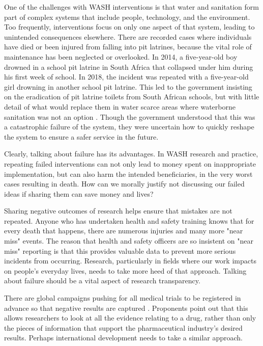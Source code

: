 \documentclass[twocolumn, serif, authordate, editorial]{jote-article}
\begin{document}
One of the challenges with WASH interventions is that water and sanitation form part of complex systems that include people, technology, and the environment. Too frequently, interventions focus on only one aspect of that system, leading to unintended consequences elsewhere. There are recorded cases where individuals have died or been injured from falling into pit latrines, because the vital role of maintenance has been neglected or overlooked. In 2014, a five-year-old boy drowned in a school pit latrine in South Africa that collapsed under him during his first week of school. In 2018, the incident was repeated with a five-year-old girl drowning in another school pit latrine. This led to the government insisting on the eradication of pit latrine toilets from South African schools, but with little detail of what would replace them in water scarce areas where waterborne sanitation was not an option \parencite{Fihlani2018}. Though the government understood that this was a catastrophic failure of the system, they were uncertain how to quickly reshape the system to ensure a safer service in the future.

Clearly, talking about failure has its advantages. In WASH research and practice, repeating failed interventions can not only lead to money spent on inappropriate implementation, but can also harm the intended beneficiaries, in the very worst cases resulting in death. How can we morally justify not discussing our failed ideas if sharing them can save money and lives?

Sharing negative outcomes of research helps ensure that mistakes are not repeated. Anyone who has undertaken health and safety training knows that for every death that happens, there are numerous injuries and many more "near miss" events. The reason that health and safety officers are so insistent on "near miss" reporting is that this provides valuable data to prevent more serious incidents from occurring. Research, particularly in fields where our work impacts on people’s everyday lives, needs to take more heed of that approach. Talking about failure should be a vital aspect of research transparency.

There are global campaigns pushing for all medical trials to be registered in advance so that negative results are captured \parencite{Goldacre2016}. Proponents point out that this allows researchers to look at all the evidence relating to a drug, rather than only the pieces of information that support the pharmaceutical industry’s desired results. Perhaps international development needs to take a similar approach.
\end{document}

